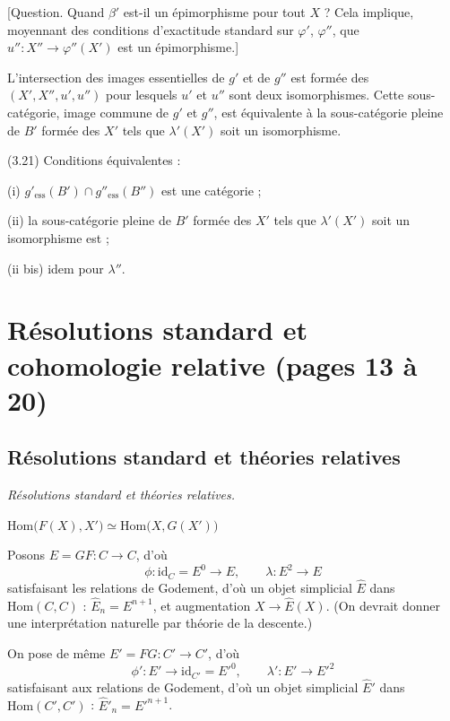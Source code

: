 \documentclass[11pt,a4paper]{article}
\begin{document}
[Question. Quand $\beta'$ est-il un épimorphisme pour tout $X$ ? Cela
 implique, moyennant des conditions d'exactitude
 standard sur $\varphi'$, $\varphi''$, que
$u'' : X'' \to \varphi''(X')$ est un épimorphisme.]

L'intersection des images essentielles de $g'$ et de $g''$ est formée des
$(X', X'', u', u'')$ pour lesquels $u'$ et $u''$ sont deux isomorphismes.
 Cette sous-catégorie, image commune de $g'$ et $g''$,
est équivalente à la sous-catégorie pleine de $B'$ formée des $X'$ tels que
$\lambda'(X')$ soit un isomorphisme.

(3.21) \quad Conditions équivalentes :

(i) $g'_{\mathrm{ess}}(B') \cap g''_{\mathrm{ess}}(B'')$ est une catégorie
 ;

(ii) la sous-catégorie pleine de $B'$ formée des $X'$ tels que
$\lambda'(X')$ soit un isomorphisme est  ;

(ii bis) idem pour $\lambda''$.

\section*{Résolutions standard et cohomologie relative (pages 13 à 20)}

\subsection*{Résolutions standard et théories relatives}

\emph{Résolutions standard et théories relatives.}

\qquad
$\mathrm{Hom}\bigl( F(X), X' \bigr) \simeq \mathrm{Hom}\bigl( X, G(X') \bigr)$

Posons $E = GF : C \to C$, d'où
\[
  \phi : \mathrm{id}_{C} = E^{0} \longrightarrow E , \qquad
  \lambda : E^{2} \longrightarrow E
\]
satisfaisant les relations de Godement, d'où un objet simplicial $\widehat{E}$
dans $\mathrm{Hom}(C, C)$ : $\widehat{E}_{n} = E^{n+1}$, et augmentation
$X \to \widehat{E}(X)$. (On devrait donner une interprétation naturelle par
théorie de la descente.)

On pose de même $E' = FG : C' \to C'$, d'où
\[
  \phi' : E' \longrightarrow \mathrm{id}_{C'} = E'^{0} , \qquad
  \lambda' : E' \longrightarrow E'^{2}
\]
satisfaisant aux relations de Godement, d'où un objet simplicial
$\widehat{E}'$ dans $\mathrm{Hom}(C', C')$ : $\widehat{E}'_{n} = E'^{n+1}$.
\end{document}
